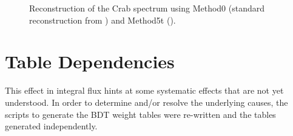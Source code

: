 \documentclass[main.tex]{subfiles}
\begin{document}
\begin{figure}[H]
  \begin{center}
  \end{center}
  \caption[Crab spectrum reconstruction.]{Reconstruction of the Crab spectrum using Method0 (standard reconstruction from \vegas) and Method5t (\disp).}
  \label{fig:spectrum_compare}
\end{figure}

\section{\disp Table Dependencies}
This effect in integral flux hints at some systematic effects that are not yet understood. In order to determine and/or resolve the underlying causes, the scripts to generate the BDT weight tables were re-written and the tables generated independently.
\end{document}
